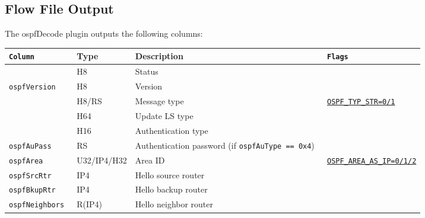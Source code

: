 \documentclass[documentation]{subfiles}
\begin{document}
\subsection{Flow File Output}
The ospfDecode plugin outputs the following columns:
\begin{longtable}{>{\tt}lll>{\tt\small}l}
    \toprule
    {\bf Column}          & {\bf Type}  & {\bf Description}                                    & {\bf Flags}\\
    \midrule\endhead%
    \nameref{ospfStat}    & H8          & Status                                               & \\
    ospfVersion           & H8          & Version                                              & \\
    \nameref{ospfType}    & H8/RS       & Message type                                         & \hyperref[s:ospf-of]{OSPF\_TYP\_STR=0/1} \\
    \nameref{ospfLSType}  & H64         & Update LS type                                       & \\
    \nameref{ospfAuType}  & H16         & Authentication type                                  & \\
    ospfAuPass            & RS          & Authentication password (if {\tt ospfAuType == 0x4}) & \\
    ospfArea              & U32/IP4/H32 & Area ID                                              & \hyperref[s:ospf-of]{OSPF\_AREA\_AS\_IP=0/1/2}\\
    ospfSrcRtr            & IP4         & Hello source router                                  & \\
    ospfBkupRtr           & IP4         & Hello backup router                                  & \\
    ospfNeighbors         & R(IP4)      & Hello neighbor router                                & \\
    \bottomrule
\end{longtable}
\end{document}

